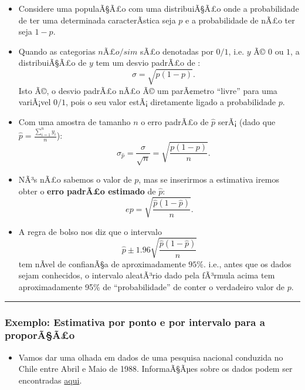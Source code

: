\documentclass[]{article}
\providecommand{\tightlist}{%
  \setlength{\itemsep}{0pt}\setlength{\parskip}{0pt}}
\begin{document}
\begin{itemize}
\tightlist
\item
  Considere uma populaÃ§Ã£o com uma distribuiÃ§Ã£o onde a probabilidade
  de ter uma determinada caracterÃ­stica seja \(p\) e a probabilidade de
  nÃ£o ter seja \(1-p\).
\item
  Quando as categorias \(nÃ£o/sim\) sÃ£o denotadas por \(0/1\), i.e.
  \(y\) Ã© \(0\) ou \(1\), a distribuiÃ§Ã£o de \(y\) tem um desvio
  padrÃ£o de : \[
    \quad \sigma=\sqrt{p(1-p)}.
    \] Isto Ã©, o desvio padrÃ£o nÃ£o Ã© um parÃ¢metro ``livre'' para
  uma variÃ¡vel \(0/1\), pois o seu valor estÃ¡ diretamente ligado a
  probabilidade \(p\).
\item
  Com uma amostra de tamanho \(n\) o erro padrÃ£o de \(\hat{p}\) serÃ¡
  (dado que \(\hat{p} = \frac{\sum_{i=1}^n y_i}{n}\)): \[
    \quad \sigma_{\hat{p}}=
    \frac{\sigma}{\sqrt{n}} =\sqrt{\frac{p(1-p)}{n}}.
    \]
\item
  NÃ³s nÃ£o sabemos o valor de \(p\), mas se inserirmos a estimativa
  iremos obter o \textbf{erro padrÃ£o estimado} de \(\hat{p}\): \[
    ep=\sqrt{\frac{\hat{p}(1-\hat{p})}{n}}.
    \]
\item
  A regra de bolso nos diz que o intervalo
  \[\hat{p}\pm 1.96\sqrt{\frac{\hat{p}(1-\hat{p})}{n}}\] tem nÃ­vel de
  confianÃ§a de aproximadamente \(95\%\). i.e., antes que os dados sejam
  conhecidos, o intervalo aleatÃ³rio dado pela fÃ³rmula acima tem
  aproximadamente 95\% de ``probabilidade'' de conter o verdadeiro valor
  de \(p\).
\end{itemize}

\begin{center}\rule{0.5\linewidth}{\linethickness}\end{center}

\subsubsection{Exemplo: Estimativa por ponto e por intervalo para a
proporÃ§Ã£o}\label{exemplo-estimativa-por-ponto-e-por-intervalo-para-a-proporaao}

\begin{itemize}
\tightlist
\item
  Vamos dar uma olhada em dados de uma pesquisa nacional conduzida no
  Chile entre Abril e Maio de 1988. InformaÃ§Ãµes sobre os dados podem
  ser encontradas
  \href{https://www.rdocumentation.org/packages/car/versions/2.1-6/topics/Chile}{aqui}.
\end{itemize}
\end{document}
